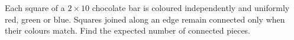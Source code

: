 Each square of a $2\times10$ chocolate bar is coloured independently and uniformly red, green or blue. Squares joined along an edge remain connected only when their colours match. Find the expected number of connected pieces.
